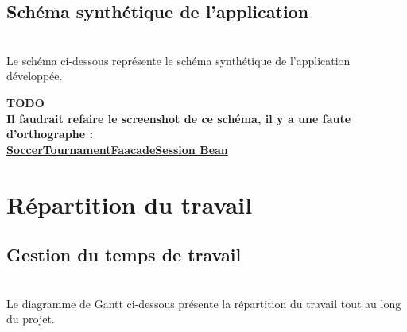 \documentclass[10pt]{report}
\begin{document}
\section{Schéma synthétique de l'application}
~\\
Le schéma ci-dessous représente le schéma synthétique de l'application développée. \\
	\begin{figure}[hp]
	      \begin{center}
	      \end{center}
	\end{figure}
\textbf{TODO \\ Il faudrait refaire le screenshot de ce schéma, il y a une faute d'orthographe : \\ \underline{SoccerTournamentFaacadeSession Bean}}

\newpage
\chapter{Répartition du travail}
\section{Gestion du temps de travail}
~\\
Le diagramme de Gantt ci-dessous présente la répartition du travail tout au long du projet. \\
	\begin{figure}[hp]
	      \begin{center}
	      \end{center}
	\end{figure}
\\
\end{document}
